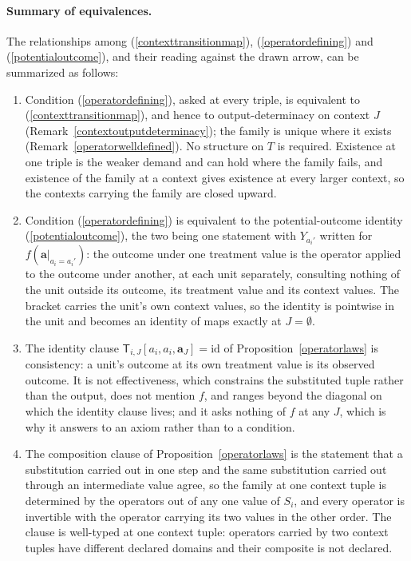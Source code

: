 \documentclass{article}
\theoremstyle{definition}
\theoremstyle{remark}
\begin{document}
\paragraph{Summary of equivalences.} The relationships among (\ref{contexttransitionmap}), (\ref{operatordefining}) and (\ref{potentialoutcome}), and their reading against the drawn arrow, can be summarized as follows:
\begin{enumerate}[label=(\alph*)]
\item Condition (\ref{operatordefining}), asked at every triple, is equivalent to (\ref{contexttransitionmap}), and hence to output-determinacy on context $J$ (Remark~\ref{contextoutputdeterminacy}); the family is unique where it exists (Remark~\ref{operatorwelldefined}). No structure on $T$ is required. Existence at one triple is the weaker demand and can hold where the family fails, and existence of the family at a context gives existence at every larger context, so the contexts carrying the family are closed upward.
\item Condition (\ref{operatordefining}) is equivalent to the potential-outcome identity (\ref{potentialoutcome}), the two being one statement with $Y_{a_i'}$ written for $f(\boldsymbol{a}|_{a_i = a_i'})$: the outcome under one treatment value is the operator applied to the outcome under another, at each unit separately, consulting nothing of the unit outside its outcome, its treatment value and its context values. The bracket carries the unit's own context values, so the identity is pointwise in the unit and becomes an identity of maps exactly at $J = \emptyset$.
\item The identity clause $\mathsf{T}_{i,J}[a_i, a_i, \boldsymbol{a}_J] = \mathrm{id}$ of Proposition~\ref{operatorlaws} is consistency: a unit's outcome at its own treatment value is its observed outcome. It is not effectiveness, which constrains the substituted tuple rather than the output, does not mention $f$, and ranges beyond the diagonal on which the identity clause lives; and it asks nothing of $f$ at any $J$, which is why it answers to an axiom rather than to a condition.
\item The composition clause of Proposition~\ref{operatorlaws} is the statement that a substitution carried out in one step and the same substitution carried out through an intermediate value agree, so the family at one context tuple is determined by the operators out of any one value of $S_i$, and every operator is invertible with the operator carrying its two values in the other order. The clause is well-typed at one context tuple: operators carried by two context tuples have different declared domains and their composite is not declared.

\end{enumerate}
\end{document}

